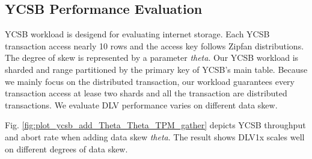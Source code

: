 \documentclass[conference]{IEEEtran}
\begin{document}
\subsection{YCSB Performance Evaluation}

YCSB\cite{YCSB:conf/cloud/CooperSTRS10} workload is desigend for evaluating internet storage.
Each YCSB transaction access nearly 10 rows and the access key follows Zipfan distributions.
The degree of skew is represented by a parameter \emph{theta}.
Our YCSB workload is sharded and range partitioned by the primary key of YCSB's main table.
Because we mainly focus on the distributed transaction, our workload guarantees every transaction access at lease two shards and all the transaction are distributed transactions.
We evaluate DLV performance varies on different data skew.


Fig.   \ref{fig:plot_ycsb_add_Theta_Theta_TPM_gather} depicts YCSB throughput and abort rate when adding data skew \emph{theta}.
The result shows DLV1x scales well on different degrees of data skew.
\end{document}
